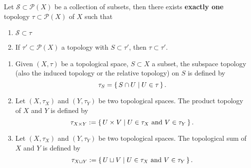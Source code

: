 \begin{thmbox}
    \begin{lemma}
    Let \(\mathcal{S} \subset \mathcal{P}(X)\) be a {\color{mathobj}collection of subsets}, then there {\color{maththen}exists} \textbf{exactly one} topology \(\tau \subset \mathcal{P}(X)\) of \(X\) such that
    \begin{enumerate}
        \item \(\mathcal{S} \subset \tau\)
        \item If \(\tau' \subset \mathcal{P}(X)\) a topology with \(S \subset \tau'\), then \(\tau \subset \tau'\).
    \end{enumerate}
    \end{lemma}
\end{thmbox}

\begin{defbox}
    \begin{definition}
        \begin{enumerate}
            \item Given \((X, \tau)\) be a {\color{mathif}topological space}, \(S \subset X\) a subset, the {\color{maththen}subspace topology} (also the induced topology or the relative topology) on \(S\) is defined by
            \begin{equation*}
                \tau_S = \left\{\, S \cap U \mid U \in \tau \,\right\} \text{.}
            \end{equation*}
            \item Let \((X, \tau_X)\) and \((Y, \tau_Y)\) be two {\color{mathif}topological spaces}. The product topology of \(X\) and \(Y\) is defined by
            \begin{equation*}
                \tau_{X \times Y} := \left\{\, U \times V \mid U \in \tau_X \text{ and } V \in \tau_Y \,\right\} \text{.}
            \end{equation*}
            \item Let \((X, \tau_X)\) and \((Y, \tau_Y)\) be two {\color{mathif}topological spaces}. The topological sum of \(X\) and \(Y\) is defined by
            \begin{align*}
                \tau_{X \sqcup Y} := \left\{\, U \sqcup V \mid U \in \tau_X \text{ and } V \in \tau_Y \,\right\} \text{.}
            \end{align*}
        \end{enumerate}
    \end{definition}
\end{defbox}

